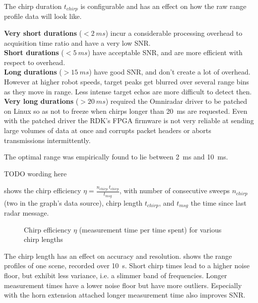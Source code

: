 The chirp duration \(t_{chirp}\) is configurable and has an effect on
how the raw range profile data will look like.

\textbf{Very short durations} (\(<\SI{2}{ms}\)) incur a considerable processing
overhead to acquisition time ratio and have a very low SNR.\\
\textbf{Short durations} (\(<\SI{5}{ms}\)) have acceptable SNR, and are more
efficient with respect to overhead.\\
\textbf{Long durations} (\(>\SI{15}{ms}\))
have good SNR, and don't create a lot of overhead. However at higher
robot speeds, target peaks get blurred over several range bins as they
move in range. Less intense target echos are more difficult to detect
then.\\
\textbf{Very long durations} (\(>\SI{20}{ms}\)) required the Omniradar
driver to be patched on Linux so as not to freeze when chirps longer
than \SI{20}{ms} are requested. Even with the patched driver the RDK's FPGA
firmware is not very reliable at sending large volumes of data at once
and corrupts packet headers or aborts transmissions intermittently.

The optimal range was empirically found to lie between \SI{2}{ms} and \SI{10}{ms}.

TODO wording here

 shows the chirp efficiency
\(\eta = \frac{n_{chirp}~t_{chirp}}{t_{msg}}\), with number of
consecutive sweeps \(n_{chirp}\) (two in the graph's data source), chirp
length \(t_{chirp}\), and \(t_{msg}\) the time since last radar message.

\begin{figure}[htbp]
    \centering
    \def\svgwidth{10cm}
    
    \caption{Chirp efficiency \(\eta\) (measurement time per time spent) for various chirp lengths}
    \label{fig:fig_chirp_eff}
\end{figure}

The chirp length has an effect on accuracy and resolution.  shows the range profiles of one scene, recorded over \SI{10}{s}. Short chirp times lead to a higher noise floor, but exhibit less variance, i.e. a slimmer band of frequencies. Longer measurement times have a lower noise floor but have more outliers. Especially with the horn extension attached longer measurement time also improves SNR.

